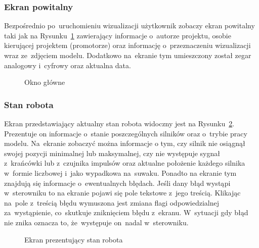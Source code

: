 \subsubsection{Ekran powitalny}
Bezpośrednio po~uruchomieniu wizualizacji użytkownik zobaczy ekran powitalny taki jak na Rysunku~\ref{vis1} zawierający informacje o~autorze projektu, osobie kierującej projektem (promotorze) oraz informację o~przeznaczeniu wizualizacji wraz ze~zdjęciem modelu. Dodatkowo na~ekranie tym umieszczony został zegar analogowy i~cyfrowy oraz aktualna data.
\begin{figure}[!htb]
\centering 		
\caption{Okno główne} 	
\label{vis1}
\end{figure}
\subsubsection{Stan robota}
Ekran przedstawiający aktualny stan robota widoczny jest na Rysunku~\ref{vis2}. Prezentuje on informacje o~stanie poszczególnych silników oraz o~trybie pracy modelu. Na~ekranie zobaczyć można informacje o tym, czy silnik nie osiągnął swojej pozycji minimalnej lub maksymalnej, czy nie występuje sygnał z~krańcówki lub z~czujnika impulsów oraz aktualne położenie każdego silnika w~formie liczbowej i~jako wypadkowa na~suwaku. Ponadto na ekranie tym znajdują się informacje o~ewentualnych błędach. Jeśli dany błąd wystąpi w~sterowniku to na ekranie pojawi się pole tekstowe z~jego treścią. Klikając na~pole z~treścią błędu wymuszona jest zmiana flagi odpowiedzialnej za~wystąpienie, co~skutkuje zniknięciem błędu z~ekranu. W~sytuacji gdy błąd nie znika oznacza to, że~występuje on~nadal w~sterowniku.
\begin{figure}[!htb]	
\centering 	
\caption{Ekran prezentujący stan robota} 
\label{vis2}
\end{figure}
